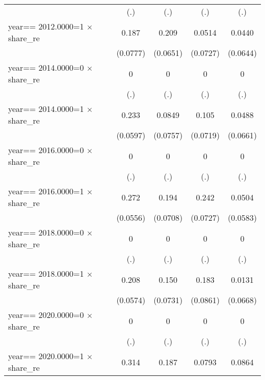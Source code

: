 \begin{table}[htbp]
\begin{tabular}{l*{4}{c}}
                &      (.)         &      (.)         &      (.)         &      (.)         \\
\addlinespace
year==  2012.0000=1 $\times$ share\_re&    0.187\sym{**} &    0.209\sym{***}&   0.0514         &   0.0440         \\
                & (0.0777)         & (0.0651)         & (0.0727)         & (0.0644)         \\
\addlinespace
year==  2014.0000=0 $\times$ share\_re&        0         &        0         &        0         &        0         \\
                &      (.)         &      (.)         &      (.)         &      (.)         \\
\addlinespace
year==  2014.0000=1 $\times$ share\_re&    0.233\sym{***}&   0.0849         &    0.105         &   0.0488         \\
                & (0.0597)         & (0.0757)         & (0.0719)         & (0.0661)         \\
\addlinespace
year==  2016.0000=0 $\times$ share\_re&        0         &        0         &        0         &        0         \\
                &      (.)         &      (.)         &      (.)         &      (.)         \\
\addlinespace
year==  2016.0000=1 $\times$ share\_re&    0.272\sym{***}&    0.194\sym{***}&    0.242\sym{***}&   0.0504         \\
                & (0.0556)         & (0.0708)         & (0.0727)         & (0.0583)         \\
\addlinespace
year==  2018.0000=0 $\times$ share\_re&        0         &        0         &        0         &        0         \\
                &      (.)         &      (.)         &      (.)         &      (.)         \\
\addlinespace
year==  2018.0000=1 $\times$ share\_re&    0.208\sym{***}&    0.150\sym{**} &    0.183\sym{**} &   0.0131         \\
                & (0.0574)         & (0.0731)         & (0.0861)         & (0.0668)         \\
\addlinespace
year==  2020.0000=0 $\times$ share\_re&        0         &        0         &        0         &        0         \\
                &      (.)         &      (.)         &      (.)         &      (.)         \\
\addlinespace
year==  2020.0000=1 $\times$ share\_re&    0.314\sym{*}  &    0.187\sym{**} &   0.0793         &   0.0864         \\

\end{tabular}
\end{table}
